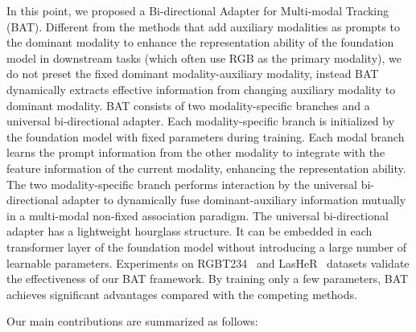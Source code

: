\documentclass[letterpaper]{article} %
\begin{document}
In this point, we proposed a Bi-directional Adapter for Multi-modal Tracking (BAT). Different from the methods that add auxiliary modalities as prompts to the dominant modality to enhance the representation ability of the foundation model in downstream tasks (which often use RGB as the primary modality), we do not preset the fixed dominant modality-auxiliary modality, instead BAT dynamically extracts effective information from changing auxiliary modality to dominant modality.
BAT consists of two modality-specific branches and a universal bi-directional adapter. Each modality-specific branch is initialized by the foundation model with fixed parameters during training.
Each modal branch learns the prompt information from the other modality to integrate with the feature information of the current modality, enhancing the representation ability. 
The two modality-specific branch performs interaction by the universal bi-directional adapter to dynamically fuse dominant-auxiliary information mutually in a multi-modal non-fixed association paradigm.
The universal bi-directional adapter has a lightweight hourglass structure. It can be embedded in each transformer layer of the foundation model without introducing a large number of learnable parameters. Experiments on RGBT234~\cite{rgbt234} and LasHeR~\cite{LasHeR} datasets validate the effectiveness of our BAT framework. By training only a few parameters, BAT achieves significant advantages compared with the competing methods.

Our main contributions are summarized as follows:
\end{document}
